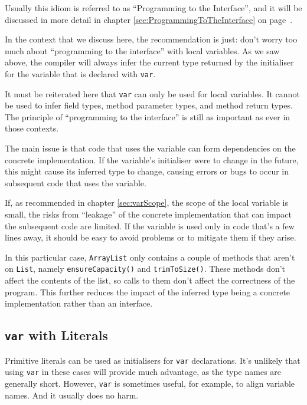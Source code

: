 \documentclass[11pt,a4paper, titlepage, parskip=half, headsepline, footsepline, cleardoublepage=current, headheight=1cm]{scrbook}
\newcommand*{\tqref}[1]{\hyperref[{#1}]{\ref*{#1}}}
\newcommand*{\tqvref}[1]{\hyperref[{#1}]{\ref*{#1}} on page~\pageref{#1}}
\begin{document}
Usually this idiom is referred to as “Programming to the Interface”, and it will be discussed in more detail in chapter \tqvref{sec:ProgrammingToTheInterface}.

In the context that we discuss here, the recommendation is just: don’t worry too much about “programming to the interface” with local variables. As we saw above, the compiler will always infer the current type returned by the initialiser for the variable that is declared with \lstinline|var|.

It must be reiterated here that \lstinline|var| can only be used for local variables. It cannot be used to infer field types, method parameter types, and method return types. The principle of “programming to the interface” is still as important as ever in those contexts.

The main issue is that code that uses the variable can form dependencies on the concrete implementation. If the variable’s initialiser were to change in the future, this might cause its inferred type to change, causing errors or bugs to occur in subsequent code that uses the variable.

If, as recommended in chapter \tqref{sec:varScope}, the scope of the local variable is small, the risks from “leakage” of the concrete implementation that can impact the subsequent code are limited. If the variable is used only in code that’s a few lines away, it should be easy to avoid problems or to mitigate them if they arise.

In this particular case, \lstinline|ArrayList| only contains a couple of methods that aren’t on \lstinline|List|, namely \lstinline|ensureCapacity()| and \lstinline|trimToSize()|. These methods don’t affect the contents of the list, so calls to them don’t affect the correctness of the program. This further reduces the impact of the inferred type being a concrete implementation rather than an interface.


\subsection{\lstinline|var| with Literals}
Primitive literals can be used as initialisers for \lstinline|var| declarations. It’s unlikely that using \lstinline|var| in these cases will provide much advantage, as the type names are generally short. However, \lstinline|var| is sometimes useful, for example, to align variable names. And it usually does no harm.
\end{document}
